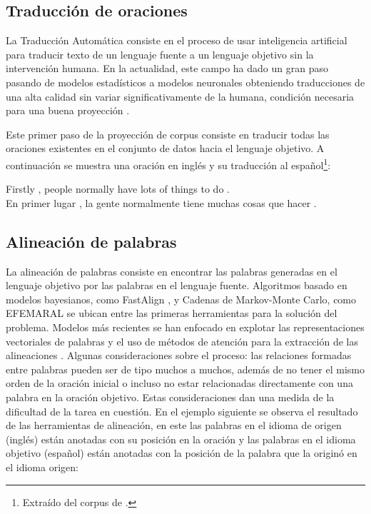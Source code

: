 \documentclass[a4paper,11pt,twocolumn,twoside]{article}
\begin{document}
\subsection{Traducción de oraciones}

La Traducción Automática consiste en el proceso de usar inteligencia artificial para
traducir texto de un lenguaje fuente a un lenguaje objetivo sin la intervención humana.
En la actualidad, este campo ha dado un gran paso pasando de modelos estadísticos a modelos
neuronales obteniendo traducciones de una alta calidad sin variar significativamente de la humana, 
condición necesaria para una buena proyección \cite{eger2018cross}.

Este primer paso de la proyección de corpus consiste en traducir todas las oraciones existentes 
en el conjunto de datos hacia el lenguaje objetivo. 
A continuación se muestra una oración en inglés y su traducción al español\footnote{Extraído del corpus de \cite{stab2017parsing}.}:

\begin{adjustwidth}{25pt}{25pt}
	Firstly , people normally have lots of things to do . \\
	En primer lugar , la gente normalmente tiene muchas cosas que hacer .
\end{adjustwidth}

\subsection{Alineación de palabras}

La alineación de palabras consiste en encontrar las palabras generadas en el lenguaje objetivo por las 
palabras en el lenguaje fuente.
Algoritmos basado en modelos bayesianos, como FastAlign \cite{dyer2013fastalign}, 
y Cadenas de Markov-Monte Carlo, como EFEMARAL \cite{ostling2016efficient} se ubican entre
las primeras herramientas para la solución del problema. 
Modelos más recientes se han enfocado en explotar las representaciones
vectoriales de palabras y el uso de métodos de atención para la extracción de las
alineaciones \cite{dou2021word}. Algunas consideraciones sobre el proceso: las relaciones 
formadas entre palabras pueden ser de tipo muchos a muchos, además de no tener el mismo orden de la 
oración inicial o incluso no estar relacionadas directamente con una palabra en la oración objetivo.
Estas consideraciones dan una medida de la dificultad de la tarea en cuestión.
En el ejemplo siguiente se observa el resultado de las herramientas de alineación, en este 
las palabras en el idioma de origen (inglés) están anotadas con su posición en la oración y 
las palabras en el idioma objetivo (español) están anotadas con la posición de la palabra que 
la originó en el idioma origen:
\end{document}
